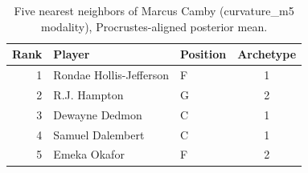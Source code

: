\begin{table}[htbp]
  \centering\small
  \begin{tabular}{rllc}
    \toprule
    Rank & Player & Position & Archetype \\
    \midrule
    1 & Rondae Hollis-Jefferson & F & 1 \\
    2 & R.J. Hampton & G & 2 \\
    3 & Dewayne Dedmon & C & 1 \\
    4 & Samuel Dalembert & C & 1 \\
    5 & Emeka Okafor & F & 2 \\
    \bottomrule
  \end{tabular}
  \caption{Five nearest neighbors of Marcus Camby (curvature_m5 modality), Procrustes-aligned posterior mean.}
  \label{tab:Marcus_Camby_neighbors_curvature_m5}
\end{table}

